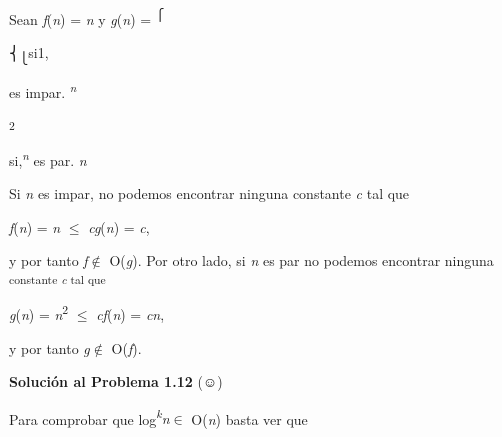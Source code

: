 \documentclass[12pt]{article}
\renewcommand{\_}{\kern-1.5pt\textunderscore\kern-1.5pt}
\begin{document}
{\fontsize{10pt}{12.0pt}\selectfont Sean \textit{f}(\textit{n}) = \textit{n }y \textit{g}(\textit{n}) = \textsuperscript{⎧ }\par}\par

{\fontsize{11pt}{13.2pt}\selectfont ⎨\textsubscript{⎩}si1, \par}\par

{\fontsize{11pt}{13.2pt}\selectfont es impar. \textit{\textsuperscript{n }}\par}\par

\begin{Center}
\textsuperscript{2 }{\fontsize{11pt}{13.2pt}\selectfont si,\textit{\textsuperscript{n }}es par. \textit{n}{\fontsize{10pt}{12.0pt}\selectfont Si \textit{n }es impar, no podemos encontrar ninguna constante \textit{c }tal que \par}\par}
\end{Center}\par

{\fontsize{10pt}{12.0pt}\selectfont \textit{f}(\textit{n}) = \textit{n }$ \leq $  \textit{cg}(\textit{n}) = \textit{c}, \par}\par

{\fontsize{10pt}{12.0pt}\selectfont y por tanto \textit{f}$ \notin $ O(\textit{g}). Por otro lado, si \textit{n }es par no podemos encontrar ninguna \textsubscript{constante \textit{c }tal que }\par}\par

{\fontsize{10pt}{12.0pt}\selectfont \textit{g}(\textit{n}) = \textit{n}\textsuperscript{2 }$ \leq $  \textit{cf}(\textit{n}) = \textit{cn}, \par}\par

{\fontsize{10pt}{12.0pt}\selectfont y por tanto \textit{g}$ \notin $ O(\textit{f}). \par}\par

{\fontsize{10pt}{12.0pt}\selectfont \textbf{Solución al Problema 1.12 }(☺) \par}\par

{\fontsize{10pt}{12.0pt}\selectfont Para comprobar que log\textit{\textsuperscript{k}n}$ \in $ O(\textit{n}) basta ver que \par}\par
\end{document}

